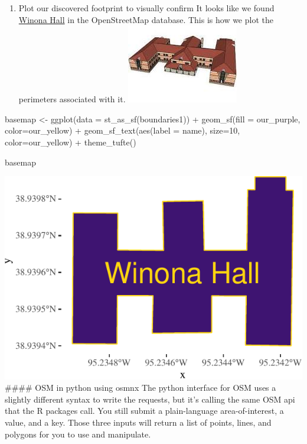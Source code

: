\documentclass[
  paper=a4,
  ,captions=tableheading
]{scrartcl}
\newenvironment{Shaded}{\begin{snugshade}}{\end{snugshade}}
\newcommand{\AttributeTok}[1]{\textcolor[rgb]{0.77,0.63,0.00}{#1}}
\newcommand{\DecValTok}[1]{\textcolor[rgb]{0.00,0.00,0.81}{#1}}
\newcommand{\FunctionTok}[1]{\textcolor[rgb]{0.00,0.00,0.00}{#1}}
\newcommand{\NormalTok}[1]{#1}
\newcommand{\OtherTok}[1]{\textcolor[rgb]{0.56,0.35,0.01}{#1}}
\newcommand{\SpecialCharTok}[1]{\textcolor[rgb]{0.00,0.00,0.00}{#1}}
\providecommand{\tightlist}{%
  \setlength{\itemsep}{0pt}\setlength{\parskip}{0pt}}
\begin{document}
\begin{enumerate}
\def\labelenumi{\arabic{enumi}.}
\setcounter{enumi}{3}
\tightlist
\item
  Plot our discovered footprint to visually confirm It looks like we
  found \href{https://www.kansasmemory.org/item/449914}{Winona Hall} in
  the OpenStreetMap database. This is how we plot the perimeters
  associated with it. \includegraphics{winona hall haskell.png}
\end{enumerate}

\begin{Shaded}
\begin{Highlighting}[]
\NormalTok{basemap }\OtherTok{\textless{}{-}} \FunctionTok{ggplot}\NormalTok{(}\AttributeTok{data =} \FunctionTok{st\_as\_sf}\NormalTok{(boundaries1)) }\SpecialCharTok{+}
  \FunctionTok{geom\_sf}\NormalTok{(}\AttributeTok{fill =}\NormalTok{ our\_purple, }\AttributeTok{color=}\NormalTok{our\_yellow) }\SpecialCharTok{+}
  \FunctionTok{geom\_sf\_text}\NormalTok{(}\FunctionTok{aes}\NormalTok{(}\AttributeTok{label =}\NormalTok{ name), }\AttributeTok{size=}\DecValTok{10}\NormalTok{, }\AttributeTok{color=}\NormalTok{our\_yellow) }\SpecialCharTok{+}
  \FunctionTok{theme\_tufte}\NormalTok{()}

\NormalTok{basemap}
\end{Highlighting}
\end{Shaded}

\includegraphics{Haskell_files/figure-latex/unnamed-chunk-14-1.pdf}
\#\#\#\# OSM in python using osmnx The python interface for OSM uses a
slightly different syntax to write the requests, but it's calling the
same OSM api that the R packages call. You still submit a plain-language
area-of-interest, a value, and a key. Those three inputs will return a
list of points, lines, and polygons for you to use and manipulate.
\end{document}
